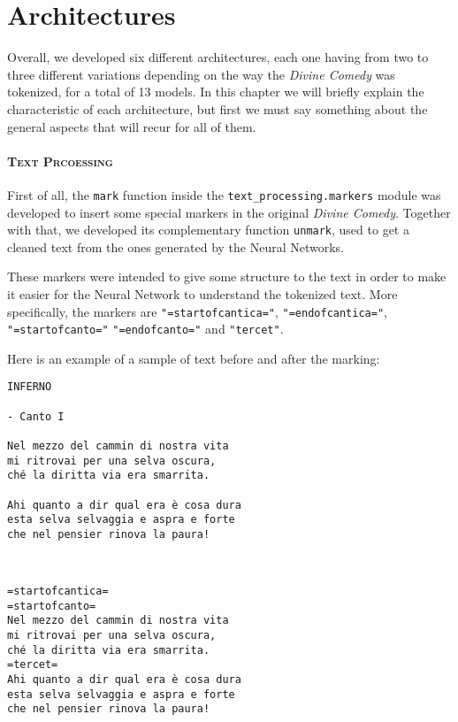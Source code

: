 \chapter{Architectures}

Overall, we developed six different architectures, each one having from two to three different variations depending on the way the \textit{Divine Comedy} was tokenized, for a total of 13 models.
In this chapter we will briefly explain the characteristic of each architecture, but first we must say something about the general aspects that will recur for all of them.

\subsubsection{\textsc{Text Prcoessing}}

First of all, the \texttt{mark} function inside the \texttt{text\_processing.markers} module was developed to insert some special markers in the original \textit{Divine Comedy}.
Together with that, we developed its complementary function \texttt{unmark}, used to get a cleaned text from the ones generated by the Neural Networks.

These markers were intended to give some structure to the text in order to make it easier for the Neural Network to understand the tokenized text. More specifically, the markers are \texttt{"=startofcantica="}, \texttt{"=endofcantica="}, \texttt{"=startofcanto="} \texttt{"=endofcanto="} and \texttt{"tercet"}.

Here is an example of a sample of text before and after the marking:

\begin{paracol}{2}
\scriptsize{\begin{verbatim}
INFERNO

- Canto I

Nel mezzo del cammin di nostra vita
mi ritrovai per una selva oscura,
ché la diritta via era smarrita.

Ahi quanto a dir qual era è cosa dura
esta selva selvaggia e aspra e forte
che nel pensier rinova la paura!
\end{verbatim}}
\switchcolumn
\scriptsize{\begin{verbatim}


=startofcantica=
=startofcanto=
Nel mezzo del cammin di nostra vita
mi ritrovai per una selva oscura,
ché la diritta via era smarrita.
=tercet=
Ahi quanto a dir qual era è cosa dura
esta selva selvaggia e aspra e forte
che nel pensier rinova la paura!
\end{verbatim}}
\end{paracol}


